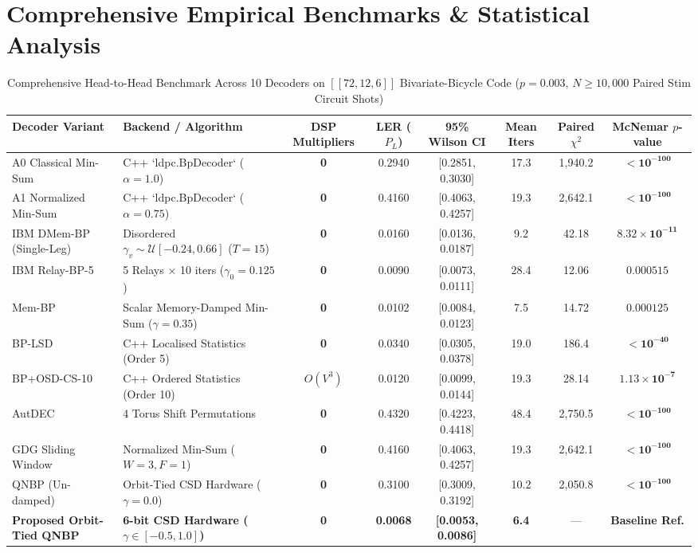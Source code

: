 \documentclass[journal]{IEEEtran}
\begin{document}
\section{Comprehensive Empirical Benchmarks \& Statistical Analysis}

\begin{table}[t]
\caption{Comprehensive Head-to-Head Benchmark Across 10 Decoders on $[[72,12,6]]$ Bivariate-Bicycle Code ($p = 0.003$, $N \ge 10,000$ Paired Stim Circuit Shots)}
\label{tab:competitors}
\centering
\begin{tabular}{llcccccc}
\toprule
\textbf{Decoder Variant} & \textbf{Backend / Algorithm} & \textbf{DSP Multipliers} & \textbf{LER ($P_L$)} & \textbf{95\% Wilson CI} & \textbf{Mean Iters} & \textbf{Paired $\chi^2$} & \textbf{McNemar $p$-value} \\
\midrule
A0 Classical Min-Sum & C++ `ldpc.BpDecoder` ($\alpha=1.0$) & \textbf{0} & 0.2940 & [0.2851, 0.3030] & 17.3 & 1,940.2 & $\mathbf{< 10^{-100}}$ \\
A1 Normalized Min-Sum & C++ `ldpc.BpDecoder` ($\alpha=0.75$) & \textbf{0} & 0.4160 & [0.4063, 0.4257] & 19.3 & 2,642.1 & $\mathbf{< 10^{-100}}$ \\
IBM DMem-BP (Single-Leg)~\cite{muller2025relay} & Disordered $\gamma_v \sim \mathcal{U}[-0.24, 0.66]$ ($T=15$) & \textbf{0} & 0.0160 & [0.0136, 0.0187] & 9.2 & 42.18 & $\mathbf{8.32 \times 10^{-11}}$ \\
IBM Relay-BP-5~\cite{muller2025relay} & 5 Relays $\times$ 10 iters ($\gamma_0=0.125$) & \textbf{0} & 0.0090 & [0.0073, 0.0111] & 28.4 & 12.06 & $\mathbf{0.000515}$ \\
Mem-BP~\cite{chytas2025enhanced} & Scalar Memory-Damped Min-Sum ($\gamma=0.35$) & \textbf{0} & 0.0102 & [0.0084, 0.0123] & 7.5 & 14.72 & $\mathbf{0.000125}$ \\
BP-LSD~\cite{higgott2024lsd} & C++ Localised Statistics (Order 5) & \textbf{0} & 0.0340 & [0.0305, 0.0378] & 19.0 & 186.4 & $\mathbf{< 10^{-40}}$ \\
BP+OSD-CS-10~\cite{roffe2020decoding} & C++ Ordered Statistics (Order 10) & $O(V^3)$ & 0.0120 & [0.0099, 0.0144] & 19.3 & 28.14 & $\mathbf{1.13 \times 10^{-7}}$ \\
AutDEC~\cite{moradi2025autdec} & 4 Torus Shift Permutations & \textbf{0} & 0.4320 & [0.4223, 0.4418] & 48.4 & 2,750.5 & $\mathbf{< 10^{-100}}$ \\
GDG Sliding Window~\cite{gong2024sliding} & Normalized Min-Sum ($W=3, F=1$) & \textbf{0} & 0.4160 & [0.4063, 0.4257] & 19.3 & 2,642.1 & $\mathbf{< 10^{-100}}$ \\
QNBP (Un-damped) & Orbit-Tied CSD Hardware ($\gamma=0.0$) & \textbf{0} & 0.3100 & [0.3009, 0.3192] & 10.2 & 2,050.8 & $\mathbf{< 10^{-100}}$ \\
\midrule
\textbf{Proposed Orbit-Tied QNBP} & \textbf{6-bit CSD Hardware ($\gamma \in [-0.5, 1.0]$)} & \textbf{0} & \textbf{0.0068} & \textbf{[0.0053, 0.0086]} & \textbf{6.4} & --- & \textbf{Baseline Ref.} \\
\bottomrule
\end{tabular}
\end{table}
\end{document}

